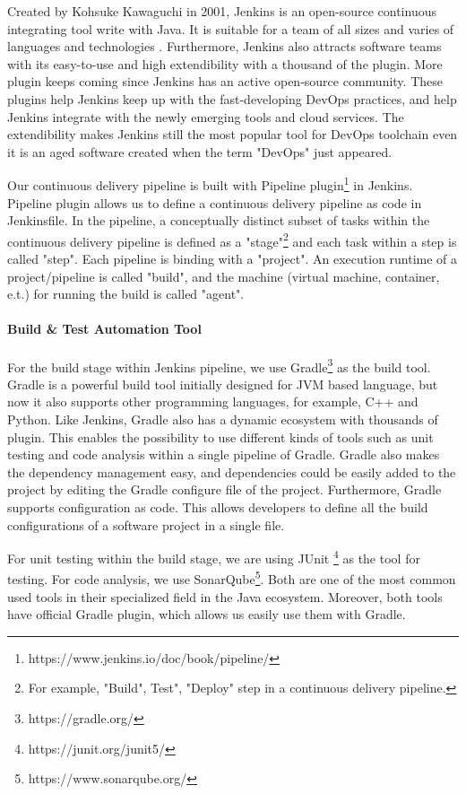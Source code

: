 \par
Created by Kohsuke Kawaguchi in 2001, Jenkins is an open-source continuous integrating tool write with Java. It is suitable for a team of all sizes and varies of languages and technologies \cite{smart2011jenkins}. Furthermore, Jenkins also attracts software teams with its easy-to-use and high extendibility \cite{smart2011jenkins} with a thousand of the plugin. More plugin keeps coming since Jenkins has an active open-source community. These plugins help Jenkins keep up with the fast-developing DevOps practices, and help Jenkins integrate with the newly emerging tools and cloud services. The extendibility makes Jenkins still the most popular tool for DevOps toolchain even it is an aged software created when the term "DevOps" just appeared.
\par
Our continuous delivery pipeline is built with Pipeline plugin\footnote{https://www.jenkins.io/doc/book/pipeline/} in Jenkins.
Pipeline plugin allows us to define a continuous delivery pipeline as code in Jenkinsfile.
In the pipeline, a conceptually distinct subset of tasks within the continuous delivery pipeline \cite{Pipeline85:online} is defined as a "stage"\footnote{For example, "Build", Test", "Deploy" step in a continuous delivery pipeline.} and each task within a step is called "step". Each pipeline is binding with a "project". An execution runtime of a project/pipeline is called "build", and the machine (virtual machine, container, e.t.) for running the build is called "agent".
\paragraph[]{Build \& Test Automation Tool}
For the build stage within Jenkins pipeline, we use Gradle\footnote{https://gradle.org/} as the build tool.
Gradle is a powerful build tool initially designed for JVM based language, but now it also supports other programming languages, for example, C++ and Python. Like Jenkins, Gradle also has a dynamic ecosystem with thousands of plugin. This enables the possibility to use different kinds of tools such as unit testing and code analysis within a single pipeline of Gradle. Gradle also makes the dependency management easy, and dependencies could be easily added to the project by editing the Gradle configure file of the project. Furthermore, Gradle supports configuration as code. This allows developers to define all the build configurations of a software project in a single file.
\par
For unit testing within the build stage, we are using JUnit \footnote{https://junit.org/junit5/} as the tool for testing. For code analysis, we use SonarQube\footnote{https://www.sonarqube.org/}. Both are one of the most common used tools in their specialized field in the Java ecosystem. Moreover, both tools have official Gradle plugin, which allows us easily use them with Gradle.
